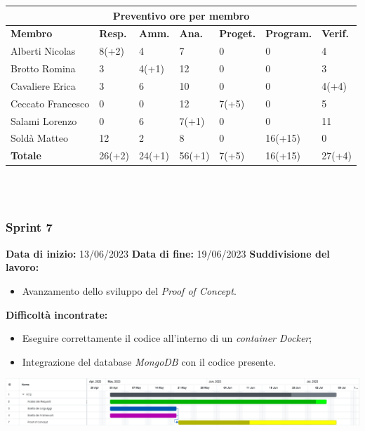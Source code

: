 \documentclass[a4paper, 12pt]{article}
\begin{document}
\begin{center}
	\begin{tabularx}{\textwidth}{|X|X|X|X|X|X|X|}
		\hline
		\multicolumn{7}{|c|}{\textbf{Preventivo ore per membro}}                                           \\
		\hline
		\hline
		\textbf{Membro}   & \textbf{Resp.}    & \textbf{Amm.}   & \textbf{Ana.} &
		\textbf{Proget.}  & \textbf{Program.} & \textbf{Verif.}                                            \\
		\hline
		Alberti Nicolas   & 8(+2)             & 4               & 7             & 0     & 0       & 4      \\
		\hline
		Brotto Romina     & 3                 & 4(+1)           & 12            & 0     & 0       & 3      \\
		\hline
		Cavaliere Erica   & 3                 & 6               & 10            & 0     & 0       & 4(+4)  \\
		\hline
		Ceccato Francesco & 0                 & 0               & 12            & 7(+5) & 0       & 5      \\
		\hline
		Salami Lorenzo    & 0                 & 6               & 7(+1)         & 0     & 0       & 11     \\
		\hline
		Soldà Matteo      & 12                & 2               & 8             & 0     & 16(+15) & 0      \\
		\hline
		\hline
		\textbf{Totale}   & 26(+2)            & 24(+1)          & 56(+1)        & 7(+5) & 16(+15) & 27(+4) \\
		\hline
	\end{tabularx}\\[8pt]
	\mbox{}\\
\end{center}

\newpage

\subsubsection{Sprint 7}
\textbf{Data di inizio:} 13/06/2023\newline
\textbf{Data di fine:} 19/06/2023\newline
\newline
\textbf{Suddivisione del lavoro:}
\begin{itemize}
	\item Avanzamento dello sviluppo del \textit{Proof of Concept}.
\end{itemize}
\textbf{Difficoltà incontrate:}
\begin{itemize}
	\item Eseguire correttamente il codice all'interno di un \textit{container Docker};
	\item Integrazione del database \textit{MongoDB} con il codice presente.
\end{itemize}
\includegraphics[scale=0.24]{RTB_6.png}\newline
\newline
\end{document}
